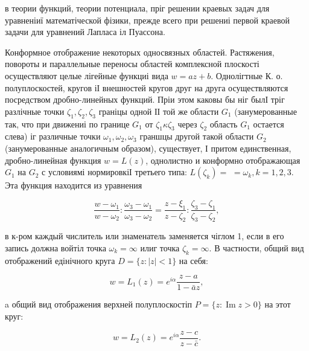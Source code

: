 \documentclass[10pt]{article}
\begin{document}
в теории функций, теории потенциала, пріг решении краевых задач для уравненіиї математіческой фізики, прежде всего при решениі первой краевой задачи для уравнений Лапласа іл Пуассона.



Конформное отображение некоторых односвязных областей. Растяжения, повороты и параллельные переносы областей комплексной плоскості осуществляют целые лігейные функциі вида $w=a z+b$. Однолігтные К. о. полуплоскостей, кругов іІ внешностей кругов друг на друга осуществляются посредством дробно-линейных функций. Пріи этом каковы бы ніг былІ тріг разлічные точки $\zeta_{1}, \zeta_{2}, \zeta_{3}$ граніцы одной ІІ той же области $G_{1}$ (занумерованные так, что при движениі по границе $G_{1}$ от $\zeta_{1} \kappa \zeta_{3}$ через $\zeta_{2}$ область $G_{1}$ остается слева) іг различные точки $\omega_{1}, \omega_{2}, \omega_{3}$ граншцы другой такой области $G_{2}$ (занумерованные аналогичным образом), существует, І притом единственная, дробно-линейная функция $w=L(z)$, однолистно и конформно отображающая $G_{1}$ на $G_{2}$ с условиямі нормировкіІ третьего типа: $L\left(\zeta_{k}\right)=$ $=\omega_{k}, k=1,2,3$. Эта функция находится из уравнения



\[

\frac{w-\omega_{1}}{w-\omega_{2}}: \frac{\omega_{3}-\omega_{1}}{\omega_{3}-\omega_{2}}=\frac{z-\xi_{1}}{z-\zeta_{2}}: \frac{\zeta_{3}-\zeta_{1}}{\zeta_{3}-\zeta_{2}},

\]



в к-ром каждый числитель или знаменатель заменяется чіглом 1, если в его запись должна войтіл точка $\omega_{k}=\infty$ илиг точка $\zeta_{k}=\infty$. В частности, общий вид отображений едінічного круга $D=\{z:|z|<1\}$ на себя:



\[

w=L_{1}(z)=e^{i \alpha} \frac{z-a}{1-\bar{a} z},

\]



a общий вид отображения верхней полуплоскостіп $P=\{z: \operatorname{Im} z>0\}$ на этот круг:



\[

w=L_{2}(z)=e^{i \alpha} \frac{z-c}{z-\bar{c}} .

\]
\end{document}
